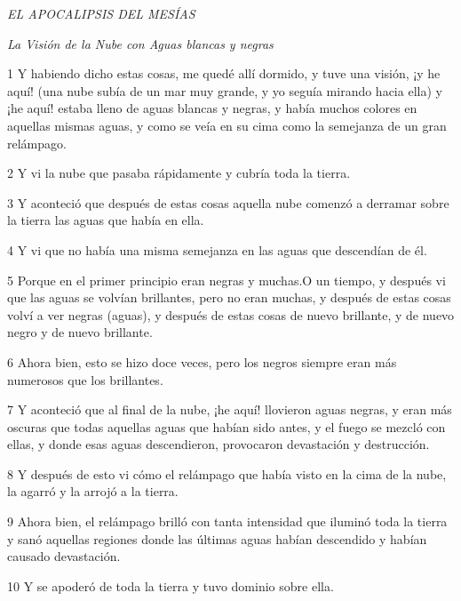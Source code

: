 \par \textit{EL APOCALIPSIS DEL MESÍAS}

\par \textit{La Visión de la Nube con Aguas blancas y negras}


\par 1 Y habiendo dicho estas cosas, me quedé allí dormido, y tuve una visión, ¡y he aquí! (una nube subía de un mar muy grande, y yo seguía mirando hacia ella) y ¡he aquí! estaba lleno de aguas blancas y negras, y había muchos colores en aquellas mismas aguas, y como se veía en su cima como la semejanza de un gran relámpago.

\par 2 Y vi la nube que pasaba rápidamente y cubría toda la tierra.

\par 3 Y aconteció que después de estas cosas aquella nube comenzó a derramar sobre la tierra las aguas que había en ella.

\par 4 Y vi que no había una misma semejanza en las aguas que descendían de él.

\par 5 Porque en el primer principio eran negras y muchas.O un tiempo, y después vi que las aguas se volvían brillantes, pero no eran muchas, y después de estas cosas volví a ver negras (aguas), y después de estas cosas de nuevo brillante, y de nuevo negro y de nuevo brillante.

\par 6 Ahora bien, esto se hizo doce veces, pero los negros siempre eran más numerosos que los brillantes.

\par 7 Y aconteció que al final de la nube, ¡he aquí! llovieron aguas negras, y eran más oscuras que todas aquellas aguas que habían sido antes, y el fuego se mezcló con ellas, y donde esas aguas descendieron, provocaron devastación y destrucción.

\par 8 Y después de esto vi cómo el relámpago que había visto en la cima de la nube, la agarró y la arrojó a la tierra.

\par 9 Ahora bien, el relámpago brilló con tanta intensidad que iluminó toda la tierra y sanó aquellas regiones donde las últimas aguas habían descendido y habían causado devastación.

\par 10 Y se apoderó de toda la tierra y tuvo dominio sobre ella.


